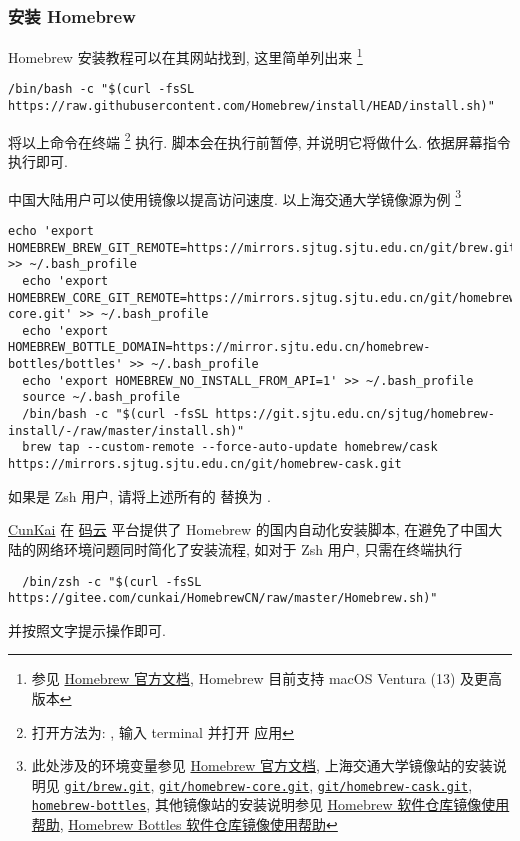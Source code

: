 \subsubsection{安装 Homebrew}

Homebrew 安装教程可以在其网站找到,
这里简单列出来%
\footnote{参见
\href{https://docs.brew.sh/Installation#git-remote-mirroring}{Homebrew 官方文档},
Homebrew 目前支持 macOS Ventura (13) 及更高版本}
\begin{lstlisting}[deleteemph = bash]
  /bin/bash -c "$(curl -fsSL https://raw.githubusercontent.com/Homebrew/install/HEAD/install.sh)"
\end{lstlisting}
将以上命令在\textsf{终端}%
\footnote{打开方法为: \keys{\cmdmac + \SPACE},
输入 \textsf{terminal} 并打开  应用}%
执行.
脚本会在执行前暂停, 并说明它将做什么. 依据屏幕指令执行即可.

中国大陆用户可以使用镜像以提高访问速度.
以上海交通大学镜像源为例%
\footnote{此处涉及的环境变量参见
\href{https://docs.brew.sh/Manpage#environment}{Homebrew 官方文档},
上海交通大学镜像站的安装说明见
\href{https://mirrors.sjtug.sjtu.edu.cn/docs/git/brew.git}{\texttt{git/brew.git}},
\href{https://mirrors.sjtug.sjtu.edu.cn/docs/git/homebrew-core.git}{\texttt{git/homebrew-core.git}},
\href{https://mirrors.sjtug.sjtu.edu.cn/docs/git/homebrew-cask.git}{\texttt{git/homebrew-cask.git}},
\href{https://mirrors.sjtug.sjtu.edu.cn/docs/homebrew-bottles}{\texttt{homebrew-bottles}},
其他镜像站的安装说明参见
\href{https://help.mirrors.cernet.edu.cn/homebrew/}{Homebrew 软件仓库镜像使用帮助},
\href{https://help.mirrors.cernet.edu.cn/homebrew-bottles/}{Homebrew Bottles 软件仓库镜像使用帮助}}
\begin{lstlisting}[deleteemph = bash]
  echo 'export HOMEBREW_BREW_GIT_REMOTE=https://mirrors.sjtug.sjtu.edu.cn/git/brew.git' >> ~/.bash_profile
  echo 'export HOMEBREW_CORE_GIT_REMOTE=https://mirrors.sjtug.sjtu.edu.cn/git/homebrew-core.git' >> ~/.bash_profile
  echo 'export HOMEBREW_BOTTLE_DOMAIN=https://mirror.sjtu.edu.cn/homebrew-bottles/bottles' >> ~/.bash_profile
  echo 'export HOMEBREW_NO_INSTALL_FROM_API=1' >> ~/.bash_profile
  source ~/.bash_profile
  /bin/bash -c "$(curl -fsSL https://git.sjtu.edu.cn/sjtug/homebrew-install/-/raw/master/install.sh)"
  brew tap --custom-remote --force-auto-update homebrew/cask https://mirrors.sjtug.sjtu.edu.cn/git/homebrew-cask.git
\end{lstlisting}
如果是 Zsh 用户, 请将上述所有的  替换为 .

\href{https://gitee.com/cunkai}{CunKai} 在%
\href{https://gitee.com/cunkai/HomebrewCN}{码云}%
平台提供了 Homebrew 的国内自动化安装脚本, 在避免了中国大陆的网络环境问题同时简化了安装流程,
如对于 Zsh 用户, 只需在终端执行
\begin{lstlisting}
  /bin/zsh -c "$(curl -fsSL https://gitee.com/cunkai/HomebrewCN/raw/master/Homebrew.sh)"
\end{lstlisting}
并按照文字提示操作即可.

